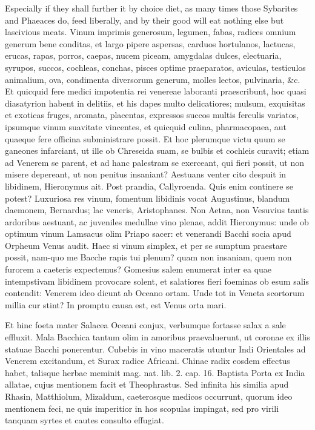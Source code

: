{Especially if they shall further it by choice diet, as many times those
Sybarites and Phaeaces do, feed liberally, and by their good will eat
nothing else but lascivious meats. Vinum imprimis generosum,
legumen, fabas, radices omnium generum bene conditas, et largo pipere
aspersas, carduos hortulanos, lactucas, erucas, rapas, porros,
caepas, nucem piceam, amygdalas dulces, electuaria, syrupos, succos,
cochleas, conchas, pisces optime praeparatos, aviculas, testiculos
animalium, ova, condimenta diversorum generum, molles lectos,
pulvinaria, \&c. Et quicquid fere medici impotentia rei venereae
laboranti praescribunt, hoc quasi diasatyrion habent in delitiis, et
his dapes multo delicatiores; mulsum, exquisitas et exoticas fruges,
aromata, placentas, expressos succos multis ferculis variatos, ipsumque
vinum suavitate vincentes, et quicquid culina, pharmacopaea, aut
quaeque fere officina subministrare possit. Et hoc plerumque victu quum
se ganeones infarciant, ut ille ob Chreseida suam, se bulbis et
cochleis curavit; etiam ad Venerem se parent, et ad hanc palestram se
exerceant, qui fieri possit, ut non misere depereant, ut non
penitus insaniant? Aestuans venter cito despuit in libidinem,
Hieronymus ait. Post prandia, Callyroenda. Quis enim continere se
potest? Luxuriosa res vinum, fomentum libidinis vocat Augustinus,
blandum daemonem, Bernardus; lac veneris, Aristophanes. Non Aetna, non
Vesuvius tantis ardoribus aestuant, ac juveniles medullae vino plenae,
addit Hieronymus: unde ob optimum vinum Lamsacus olim Priapo
sacer: et venerandi Bacchi socia apud  Orpheum Venus audit. Haec
si vinum simplex, et per se sumptum praestare possit, nam-quo me
Bacche rapis tui plenum? quam non insaniam, quem non furorem a caeteris
expectemus? Gomesius salem enumerat inter ea quae intempstivam
libidinem provocare solent, et salatiores fieri foeminas ob esum salis
contendit: Venerem ideo dicunt ab Oceano ortam.
Unde tot in Veneta scortorum millia cur stint?
In promptu causa est, est Venus orta mari.

Et hinc foeta mater Salacea Oceani conjux, verbumque fortasse salax a
sale effluxit. Mala Bacchica tantum olim in amoribus praevaluerunt, ut
coronae ex illis statuae Bacchi ponerentur. Cubebis in vino
maceratis utuntur Indi Orientales ad Venerem excitandum, et Surax
radice Africani. Chinae radix eosdem effectus habet, talisque herbae
meminit mag. nat. lib. 2. cap. 16. Baptista Porta ex India
allatae, cujus mentionem facit et Theophrastus. Sed infinita his
similia apud Rhasin, Matthiolum, Mizaldum, caeterosque medicos
occurrunt, quorum ideo mentionem feci, ne quis imperitior in hos
scopulas impingat, sed pro virili tanquam syrtes et cautes consulto
effugiat.

}
